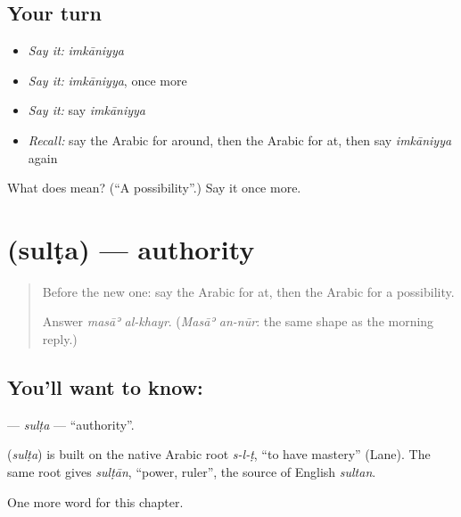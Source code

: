 \subsection*{Your turn}
\begin{itemize}
\raggedright
  \item \emph{Say it:} \emph{imkāniyya}
  \item \emph{Say it:} \emph{imkāniyya}, once more
  \item \emph{Say it:} say \emph{imkāniyya}
  \item \emph{Recall:} say the Arabic for around, then the Arabic for at, then say \emph{imkāniyya} again
\end{itemize}

\begin{tcolorbox}[breakable,colback=teal!4,colframe=teal!35!black,title={Before you move on}]
What does  mean? (\textquotedblleft{}A possibility\textquotedblright{}.) Say it once more.
\end{tcolorbox}
\section[\texorpdfstring{\ar{سلطة} (sulṭa)}{سلطة (sulṭa)}]{ (sulṭa) — authority}

\label{lesson:AR-C106-sulta}



\begin{quote}
Before the new one: say the Arabic for at, then the Arabic for a possibility.

Answer \emph{masāʾ al-khayr}. (\emph{Masāʾ an-nūr}: the same shape as the morning reply.)
\end{quote}

\subsection*{You'll want to know: }
\textbf{} — \emph{sulṭa} — \textquotedblleft{}authority\textquotedblright{}.

\begin{cousinweb}
\textbf{} (\emph{sulṭa}) is built on the native Arabic root \emph{s-l-ṭ}, \textquotedblleft{}to have mastery\textquotedblright{} (Lane). The same root gives \emph{sulṭān}, \textquotedblleft{}power, ruler\textquotedblright{}, the source of English \emph{sultan}.
\end{cousinweb}

\begin{grammarlens}[title={What you've built}]
One more word for this chapter.
\end{grammarlens}

